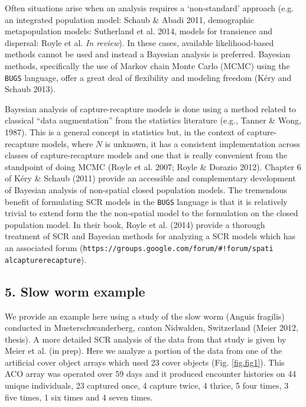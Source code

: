 \documentclass{book}
\begin{document}
Often situations arise when an analysis requires a `non-standard' approach (e.g. an integrated population model: Schaub \& Abadi 2011, demographic metapopulation models: Sutherland et al. 2014, models for transience and dispersal: Royle et al. {\it In review}). In these cases, available likelihood-based methods cannot be used and instead a Bayesian analysis is preferred. Bayesian methods, specifically the use of Markov chain Monte Carlo (MCMC) using the {\tt BUGS} language, offer a great deal of flexibility and modeling freedom (K\'{e}ry and Schaub 2013).

Bayesian analysis of capture-recapture models is done using a method
related to classical ``data augmentation'' from the statistics
literature (e.g., Tanner \& Wong, 1987).  This is a general concept in
statistics but, in the context of capture-recapture models, where $N$
is unknown, it has a consistent implementation across classes of
capture-recapture models and one that is really convenient from the
standpoint of doing MCMC (Royle et al. 2007; Royle \& Dorazio
2012). Chapter 6 of K\'{e}ry \& Schaub (2011) provide an accessible and
complementary development of Bayesian analysis of non-spatial closed
population models. The tremendous benefit of formulating SCR models in
the {\tt BUGS} language is that it is relatively trivial to extend
form the the non-spatial model to the formulation on the closed
population model. In their book, Royle et al. (2014) provide a
thorough treatment of SCR and Bayesian methods for
analyzing a SCR models which has an associated forum
(\verb|https://groups.google.com/forum/#!forum/spati| \verb|alcapturerecapture|).

\subsection*{5. Slow worm example}

We provide an example here using a study of the slow worm (Anguis
fragilis) conducted in Mueterschwanderberg, canton Nidwalden,
Switzerland (Meier 2012, thesis). A more detailed SCR analysis of the
data from that study is given by Meier et al. (in prep). Here we
analyze a portion of the data from one of the artificial cover object
arrays which used 23 cover objects (Fig. \ref{fig.fig1}). This ACO
array was operated over 59 days and it produced encounter histories on
44 unique individuals, 23 captured once, 4 capture twice, 4 thrice, 5
four times, 3 five times, 1 six times and 4 seven times.
\end{document}
